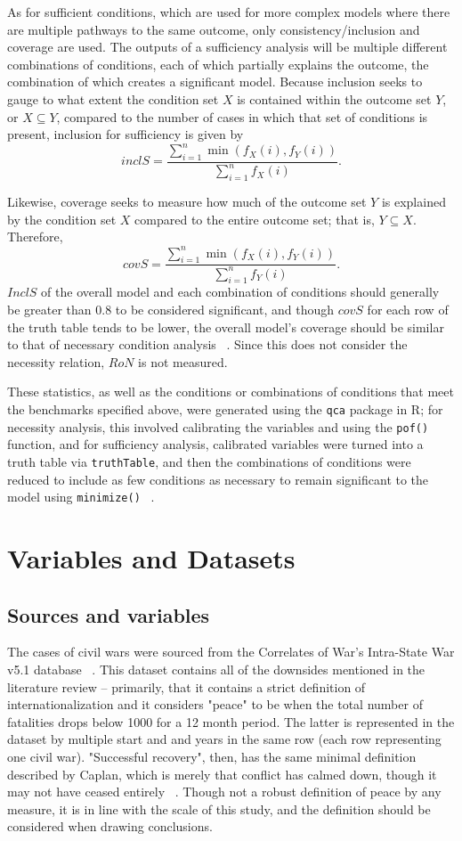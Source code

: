 \documentclass{article}
\begin{document}
As for sufficient conditions, which are used for more complex models where there are multiple pathways to the same outcome, only consistency/inclusion and coverage are used. The outputs of a sufficiency analysis will be multiple different combinations of conditions, each of which partially explains the outcome, the combination of which creates a significant model. Because inclusion seeks to gauge to what extent the condition set $X$ is contained within the outcome set $Y$, or $X\subseteq Y$, compared to the number of cases in which that set of conditions is present, inclusion for sufficiency is given by
$$inclS=\frac{\sum_{i=1}^n\min(f_X(i),f_Y(i))}{\sum_{i=1}^n f_X(i)}.$$

Likewise, coverage seeks to measure how much of the outcome set $Y$ is explained by the condition set $X$ compared to the entire outcome set; that is, $Y\subseteq X$. Therefore,
$$covS=\frac{\sum_{i=1}^n\min(f_X(i),f_Y(i))}{\sum_{i=1}^n f_Y(i)}.$$
$InclS$ of the overall model and each combination of conditions should generally be greater than 0.8 to be considered significant, and though $covS$ for each row of the truth table tends to be lower, the overall model's coverage should be similar to that of necessary condition analysis ~\cite{pappas}. Since this does not consider the necessity relation, $RoN$ is not measured.

These statistics, as well as the conditions or combinations of conditions that meet the benchmarks specified above, were generated using the \texttt{qca} package in R; for necessity analysis, this involved calibrating the variables and using the \texttt{pof()} function, and for sufficiency analysis, calibrated variables were turned into a truth table via \texttt{truthTable}, and then the combinations of conditions were reduced to include as few conditions as necessary to remain significant to the model using \texttt{minimize()} ~\cite{dusa-pkg}. 

\section{Variables and Datasets}
\subsection{Sources and variables}
The cases of civil wars were sourced from the Correlates of War's Intra-State War v5.1 database ~\cite{cow}. This dataset contains all of the downsides mentioned in the literature review -- primarily, that it contains a strict definition of internationalization and it considers "peace" to be when the total number of fatalities drops below 1000 for a 12 month period. The latter is represented in the dataset by multiple start and and years in the same row (each row representing one civil war). "Successful recovery", then, has the same minimal definition described by Caplan, which is merely that conflict has calmed down, though it may not have ceased entirely ~\cite{caplan}. Though not a robust definition of peace by any measure, it is in line with the scale of this study, and the definition should be considered when drawing conclusions.
\end{document}
